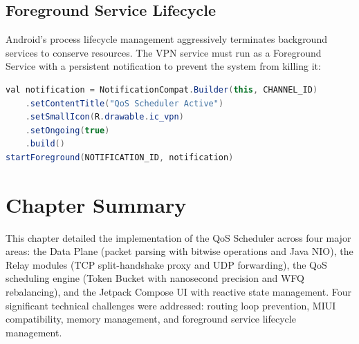 \subsection{Foreground Service Lifecycle}

Android's process lifecycle management aggressively terminates background services to conserve resources. The VPN service must run as a Foreground Service \cite{android_foreground} with a persistent notification to prevent the system from killing it:

\begin{lstlisting}[language=Java, caption={Foreground service initialization}]
val notification = NotificationCompat.Builder(this, CHANNEL_ID)
    .setContentTitle("QoS Scheduler Active")
    .setSmallIcon(R.drawable.ic_vpn)
    .setOngoing(true)
    .build()
startForeground(NOTIFICATION_ID, notification)
\end{lstlisting}


\section{Chapter Summary}
\label{sec:ch5_summary}

This chapter detailed the implementation of the QoS Scheduler across four major areas: the Data Plane (packet parsing with bitwise operations and Java NIO), the Relay modules (TCP split-handshake proxy and UDP forwarding), the QoS scheduling engine (Token Bucket with nanosecond precision and WFQ rebalancing), and the Jetpack Compose UI with reactive state management. Four significant technical challenges were addressed: routing loop prevention, MIUI compatibility, memory management, and foreground service lifecycle management.
